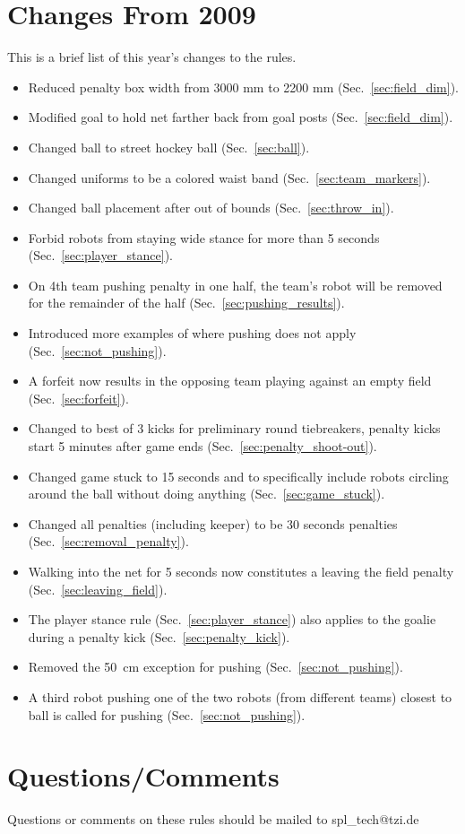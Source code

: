 \documentclass[12pt]{article}
\begin{document}
\section{Changes From 2009}

This is a brief list of this year's changes to the rules.

\begin{itemize}
\item Reduced penalty box width from 3000 mm to 2200 mm (Sec.~\ref{sec:field_dim}).
\item Modified goal to hold net farther back from goal posts (Sec.~\ref{sec:field_dim}).
\item Changed ball to street hockey ball (Sec.~\ref{sec:ball}).
\item Changed uniforms to be a colored waist band (Sec.~\ref{sec:team_markers}).
\item Changed ball placement after out of bounds (Sec.~\ref{sec:throw_in}).
\item Forbid robots from staying wide stance for more than 5 seconds (Sec.~\ref{sec:player_stance}).
\item On 4th team pushing penalty in one half, the team's robot will be removed for the remainder of the half (Sec.~\ref{sec:pushing_results}).
\item Introduced more examples of where pushing does not apply (Sec.~\ref{sec:not_pushing}).
\item A forfeit now results in the opposing team playing against an empty field (Sec.~\ref{sec:forfeit}).
\item Changed to best of 3 kicks for preliminary round tiebreakers, penalty kicks start 5 minutes after game ends (Sec.~\ref{sec:penalty_shoot-out}).
\item Changed game stuck to 15 seconds and to specifically include robots circling around the ball without doing anything (Sec.~\ref{sec:game_stuck}).
\item Changed all penalties (including keeper) to be 30 seconds penalties (Sec.~\ref{sec:removal_penalty}).
\item Walking into the net for 5 seconds now constitutes a leaving the field penalty (Sec.~\ref{sec:leaving_field}).
\item The player stance rule (Sec.~\ref{sec:player_stance}) also applies to the goalie during a penalty kick (Sec.~\ref{sec:penalty_kick}).
\item Removed the 50~cm exception for pushing (Sec.~\ref{sec:not_pushing}).
\item A third robot pushing one of the two robots (from different teams) closest to ball is called for pushing (Sec.~\ref{sec:not_pushing}).

\end{itemize}


\section{Questions/Comments}

Questions or comments on these rules should be mailed to spl\_tech@tzi.de
\end{document}
